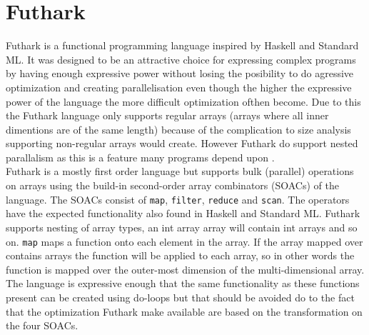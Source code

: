 \documentclass[11pt]{article}
\begin{document}



 


\section{Futhark}

Futhark is a functional programming language inspired by Haskell and Standard ML.
It was designed to be an attractive choice for expressing complex programs by having enough expressive power without
losing the posibility to do agressive optimization and creating parallelisation even though the higher the expressive power of the
language the more difficult optimization ofthen become.
Due to this the Futhark language only supports regular arrays (arrays where all inner dimentions are of the same length)
because of the complication to size analysis supporting non-regular arrays would create.
However Futhark do support nested parallalism as this is a feature many programs depend upon \cite{TroelsHenriksen}.\\

Futhark is a mostly first order language but supports bulk (parallel) operations on arrays
using the build-in second-order array combinators (SOACs) of the language. 
The SOACs consist of {\tt map}, {\tt filter}, {\tt reduce} and {\tt scan}.
The operators have the expected functionality also found in Haskell and Standard ML.
Futhark supports nesting of array types, an int array array will contain int arrays and so on.
{\tt map} maps a function onto each element in the array.
If the array mapped over contains arrays the function will be applied to each array,
so in other words the function is mapped over the outer-most dimension of the multi-dimensional array.
The language is expressive enough that the same functionality as these functions present can be created using do-loops
but that should be avoided do to the fact that the optimization Futhark make available are based on the
transformation on the four SOACs. \\
\end{document}
